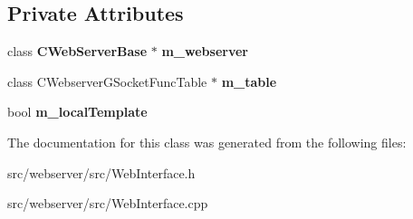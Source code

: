 \subsection*{Private Attributes}
\begin{DoxyCompactItemize}
\item 
class {\bf CWebServerBase} $\ast$ {\bfseries m\_\-webserver}\label{classCamulewebApp_a474c070efccad9442d0deffe388cafb7}

\item 
class CWebserverGSocketFuncTable $\ast$ {\bfseries m\_\-table}\label{classCamulewebApp_a34a774ef419c4dee8cbb5e601c4a5cac}

\item 
bool {\bfseries m\_\-localTemplate}\label{classCamulewebApp_a6111641b69e918f2bdcd742ab54a2b58}

\end{DoxyCompactItemize}


The documentation for this class was generated from the following files:\begin{DoxyCompactItemize}
\item 
src/webserver/src/WebInterface.h\item 
src/webserver/src/WebInterface.cpp\end{DoxyCompactItemize}
